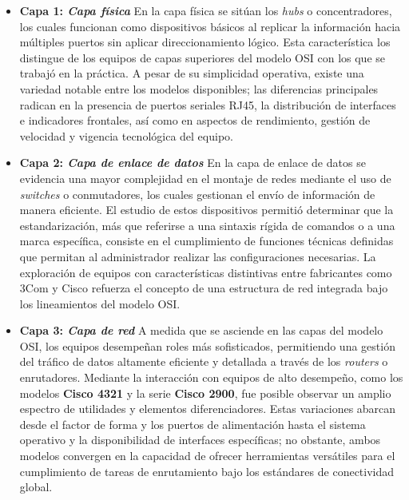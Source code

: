 \begin{itemize}
    \item \textbf{Capa 1: \textit{Capa física}}
    \newline
    En la capa física se sitúan los \textit{hubs} o concentradores, los cuales funcionan como dispositivos básicos al replicar la información hacia múltiples puertos sin aplicar direccionamiento lógico. Esta característica los distingue de los equipos de capas superiores del modelo OSI con los que se trabajó en la práctica. A pesar de su simplicidad operativa, existe una variedad notable entre los modelos disponibles; las diferencias principales radican en la presencia de puertos seriales RJ45, la distribución de interfaces e indicadores frontales, así como en aspectos de rendimiento, gestión de velocidad y vigencia tecnológica del equipo.

\item \textbf{Capa 2: \textit{Capa de enlace de datos}}
    \newline
    En la capa de enlace de datos se evidencia una mayor complejidad en el montaje de redes mediante el uso de \textit{switches} o conmutadores, los cuales gestionan el envío de información de manera eficiente. El estudio de estos dispositivos permitió determinar que la estandarización, más que referirse a una sintaxis rígida de comandos o a una marca específica, consiste en el cumplimiento de funciones técnicas definidas que permitan al administrador realizar las configuraciones necesarias. La exploración de equipos con características distintivas entre fabricantes como 3Com y Cisco refuerza el concepto de una estructura de red integrada bajo los lineamientos del modelo OSI.

\item \textbf{Capa 3: \textit{Capa de red}}
    \newline
    A medida que se asciende en las capas del modelo OSI, los equipos desempeñan roles más sofisticados, permitiendo una gestión del tráfico de datos altamente eficiente y detallada a través de los \textit{routers} o enrutadores. Mediante la interacción con equipos de alto desempeño, como los modelos \textbf{Cisco 4321} y la serie \textbf{Cisco 2900}, fue posible observar un amplio espectro de utilidades y elementos diferenciadores. Estas variaciones abarcan desde el factor de forma y los puertos de alimentación hasta el sistema operativo y la disponibilidad de interfaces específicas; no obstante, ambos modelos convergen en la capacidad de ofrecer herramientas versátiles para el cumplimiento de tareas de enrutamiento bajo los estándares de conectividad global.


\end{itemize}

